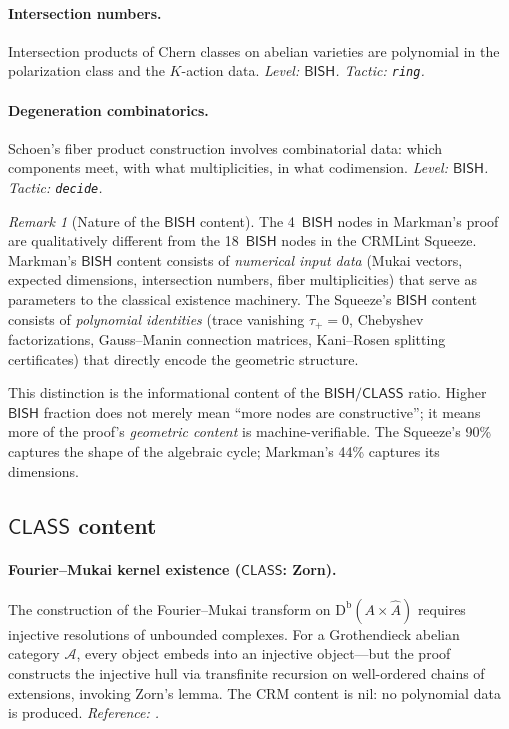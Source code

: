 \documentclass[11pt]{article}
\theoremstyle{plain}
\theoremstyle{definition}
\theoremstyle{remark}
\newtheorem{remark}[theorem]{Remark}
\newcommand{\Db}{\mathrm{D^b}}
\newcommand{\BISH}{\mathsf{BISH}}
\newcommand{\CLASS}{\mathsf{CLASS}}
\begin{document}
\paragraph{Intersection numbers.}
Intersection products of Chern classes on abelian varieties are
polynomial in the polarization class and the $K$-action data.
\emph{Level: $\BISH$. Tactic: \texttt{ring}.}

\paragraph{Degeneration combinatorics.}
Schoen's fiber product construction involves combinatorial data:
which components meet, with what multiplicities, in what codimension.
\emph{Level: $\BISH$. Tactic: \texttt{decide}.}

\begin{remark}[Nature of the $\BISH$ content]
The 4~$\BISH$ nodes in Markman's proof are qualitatively different
from the 18~$\BISH$ nodes in the CRMLint Squeeze.  Markman's $\BISH$
content consists of \emph{numerical input data} (Mukai vectors,
expected dimensions, intersection numbers, fiber multiplicities)
that serve as parameters to the classical existence machinery.  The
Squeeze's $\BISH$ content consists of \emph{polynomial identities}
(trace vanishing $\tau_+ = 0$, Chebyshev factorizations, Gauss--Manin
connection matrices, Kani--Rosen splitting certificates) that
directly encode the geometric structure.

This distinction is the informational content of the $\BISH/\CLASS$
ratio.  Higher $\BISH$ fraction does not merely mean ``more nodes
are constructive''; it means more of the proof's \emph{geometric
content} is machine-verifiable.  The Squeeze's 90\% captures the
shape of the algebraic cycle; Markman's 44\% captures its dimensions.
\end{remark}

\subsection{$\CLASS$ content}

\paragraph{Fourier--Mukai kernel existence ($\CLASS$: Zorn).}
The construction of the Fourier--Mukai transform on $\Db(A \times
\hat{A})$ requires injective resolutions of unbounded complexes.
For a Grothendieck abelian category $\mathcal{A}$, every object
embeds into an injective object---but the proof constructs the
injective hull via transfinite recursion on well-ordered chains of
extensions, invoking Zorn's lemma.  The CRM content is nil: no
polynomial data is produced.  \emph{Reference: \cite{orlov2003}.}
\end{document}
